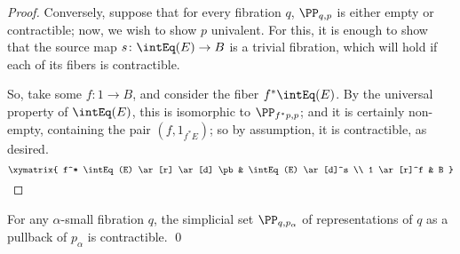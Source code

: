 \begin{proof}
Conversely, suppose that for every fibration $q$, $\PP_{q,p}$ is either empty or contractible; now, we wish to show $p$ univalent.  For this, it is enough to show that the source map $s \colon \intEq(E) \to B$ is a trivial fibration, which will hold if each of its fibers is contractible.

So, take some $f \colon 1 \to B$, and consider the fiber $f^*\intEq(E)$.  By the universal property of $\intEq(E)$, this is isomorphic to $\PP_{f^*p,p}$; and it is certainly non-empty, containing the pair $(f, 1_{f^*E})$; so by assumption, it is contractible, as desired.
\[ \begin{gathered}[b]
  \xymatrix{
    f^* \intEq(E) \ar[r] \ar[d] \pb & \intEq(E) \ar[d]^s \\
    1 \ar[r]^f & B
  } \\[-\dp\strutbox]
\end{gathered} \qedhere
\]
\end{proof}

\begin{corollary}
For any $\alpha$-small fibration $q$, the simplicial set $\PP_{q, p_\alpha}$ of representations of $q$ as a pullback of $p_\alpha$ is contractible. \qed
\end{corollary}



